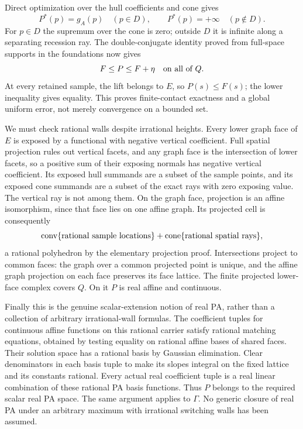 \documentclass[
  11pt,
]{article}
\begin{document}
Direct optimization over the hull coefficients and cone gives
\[ P^*(p)=g_A(p)\quad(p\in D),\qquad P^*(p)=+\infty\quad(p\notin D). \]
For \(p\in D\) the supremum over the cone is zero; outside \(D\) it is
infinite along a separating recession ray. The double-conjugate identity
proved from full-space supports in the foundations now gives
\[ F\leq P\leq F+\eta\quad\hbox{on all of }Q. \] At every retained
sample, the lift belongs to \(E\), so \(P(s)\leq F(s)\); the lower
inequality gives equality. This proves finite-contact exactness and a
global uniform error, not merely convergence on a bounded set.

We must check rational walls despite irrational heights. Every lower
graph face of \(E\) is exposed by a functional with negative vertical
coefficient. Full spatial projection rules out vertical facets, and any
graph face is the intersection of lower facets, so a positive sum of
their exposing normals has negative vertical coefficient. Its exposed
hull summands are a subset of the sample points, and its exposed cone
summands are a subset of the exact rays with zero exposing value. The
vertical ray is not among them. On the graph face, projection is an
affine isomorphism, since that face lies on one affine graph. Its
projected cell is consequently
\[ \operatorname{conv}\{\hbox{rational sample locations}\}+\operatorname{cone}\{\hbox{rational spatial rays}\}, \]
a rational polyhedron by the elementary projection proof. Intersections
project to common faces: the graph over a common projected point is
unique, and the affine graph projection on each face preserves its face
lattice. The finite projected lower-face complex covers \(Q\). On it
\(P\) is real affine and continuous.

Finally this is the genuine scalar-extension notion of real PA, rather
than a collection of arbitrary irrational-wall formulas. The coefficient
tuples for continuous affine functions on this rational carrier satisfy
rational matching equations, obtained by testing equality on rational
affine bases of shared faces. Their solution space has a rational basis
by Gaussian elimination. Clear denominators in each basis tuple to make
its slopes integral on the fixed lattice and its constants rational.
Every actual real coefficient tuple is a real linear combination of
these rational PA basis functions. Thus \(P\) belongs to the required
scalar real PA space. The same argument applies to \(\Gamma\). No
generic closure of real PA under an arbitrary maximum with irrational
switching walls has been assumed.
\end{document}
